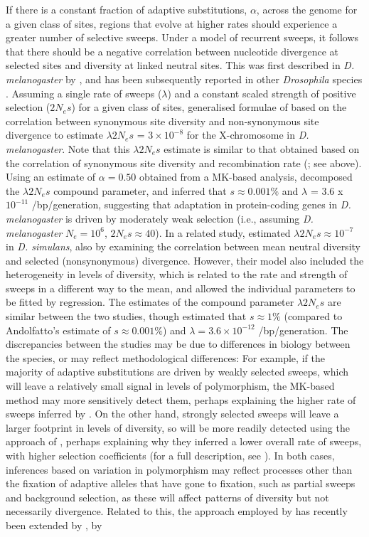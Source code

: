 If there is a constant fraction of adaptive substitutions, $\alpha$, across the genome for a given class of sites, regions that evolve at higher rates should experience a greater number of selective sweeps. Under a model of recurrent sweeps, it follows that there should be a negative correlation between nucleotide divergence at selected sites and diversity at linked neutral sites. This was first described in \textit{D. melanogaster} by \cite{RN283}, and has been subsequently reported in other \textit{Drosophila} species \citep{RN284}. Assuming a single rate of sweeps ($\lambda$) and a constant scaled strength of positive selection ($2N_es$) for a given class of sites, \cite{RN283} generalised formulae of \cite{RN277} based on the correlation between synonymous site diversity and non-synonymous site divergence to estimate  $\lambda 2N_es$ = $3 \times 10^{-8}$ for the X-chromosome in \textit{D. melanogaster}. Note that this $\lambda 2N_es$ estimate is similar to that obtained based on the correlation of synonymous site diversity and recombination rate (\citealt{RN277}; see above). Using an estimate of $\alpha = 0.50$ obtained from a MK-based analysis, \cite{RN283} decomposed the $\lambda 2N_es$ compound parameter, and inferred that $s \approx 0.001\%$ and $\lambda$ = 3.6 x $10^{-11}$ /bp/generation, suggesting that adaptation in protein-coding genes in \textit{D. melanogaster} is driven by moderately weak selection (i.e., assuming \textit{D. melanogaster} $N_e =10^6$, $2N_es \approx 40$). In a related study, \cite{RN289} estimated $\lambda 2N_es \approx 10^{-7}$ in \textit{D. simulans}, also by examining the correlation between mean neutral diversity and selected (nonsynonymous) divergence. However, their model also included the heterogeneity in levels of diversity, which is related to the rate and strength of sweeps in a different way to the mean, and allowed the individual parameters to be fitted by regression. The estimates of the compound parameter $\lambda 2N_es$ are similar between the two studies, though \cite{RN289} estimated that $s \approx 1\%$ (compared to Andolfatto's estimate of $s \approx 0.001 \%$) and $\lambda = 3.6 \times 10^{-12}$ /bp/generation. The discrepancies between the studies may be due to differences in biology between the species, or may reflect methodological differences: For example, if the majority of adaptive substitutions are driven by weakly selected sweeps, which will leave a relatively small signal in levels of  polymorphism, the MK-based method may more sensitively detect them, perhaps explaining the higher rate of sweeps inferred by \cite{RN283}. On the other hand, strongly selected sweeps will leave a larger footprint in levels of diversity, so will be more readily detected using the approach of \cite{RN289}, perhaps explaining why they inferred a lower overall rate of sweeps, with higher selection coefficients (for a full description, see \citealt{RN171}). In both cases, inferences based on variation in polymorphism may reflect processes other than the fixation of adaptive alleles that have gone to fixation, such as partial sweeps and background selection, as these will affect patterns of diversity but not necessarily divergence. Related to this, the approach employed by \cite{RN283} has recently been extended by \cite{RN290}, by 